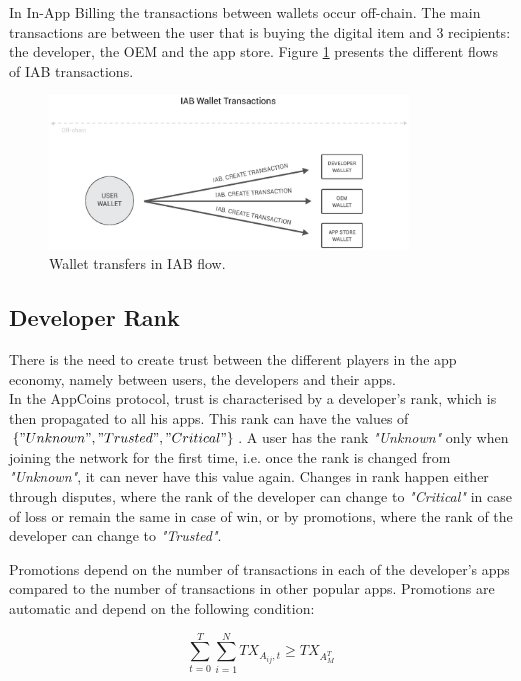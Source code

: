 In In-App Billing the transactions between wallets occur off-chain. The main transactions are between the user that is buying the digital item and 3 recipients: the developer, the OEM and the app store. Figure \ref{fig:wallet_iab_flow} presents the different flows of IAB transactions.

\begin{figure}[!ht]
\centering
\includegraphics[width=0.85\textwidth]{diagrams/wallet_transfers_iab.eps}
\caption{Wallet transfers in IAB flow.}
\label{fig:wallet_iab_flow}
\end{figure}


\subsection{Developer Rank}
\label{subsec:protocol_devrank}

There is the need to create trust between the different players in the app economy, namely between users, the developers and their apps. \\

In the AppCoins protocol, trust is characterised by a developer's rank, which is then propagated to all his apps. This rank can have the values of $\{"Unknown", "Trusted", "Critical"\}$. A user has the rank \textit{"Unknown"} only when joining the network for the first time, i.e. once the rank is changed from \textit{"Unknown"}, it can never have this value again. Changes in rank happen either through disputes, where the rank of the developer can change to \textit{"Critical"} in case of loss or remain the same in case of win, or by promotions, where the rank of the developer can change to \textit{"Trusted"}.

Promotions depend on the number of transactions in each of the developer's apps compared to the number of transactions in other popular apps. Promotions are automatic and depend on the following condition:

\begin{equation}
\sum\limits_{t=0}^{T} \sum\limits_{i=1}^{N} TX_{A_{ij},t} \geq TX_{A^{T}_{M}}
\label{eq: promo_cond}
\end{equation}

